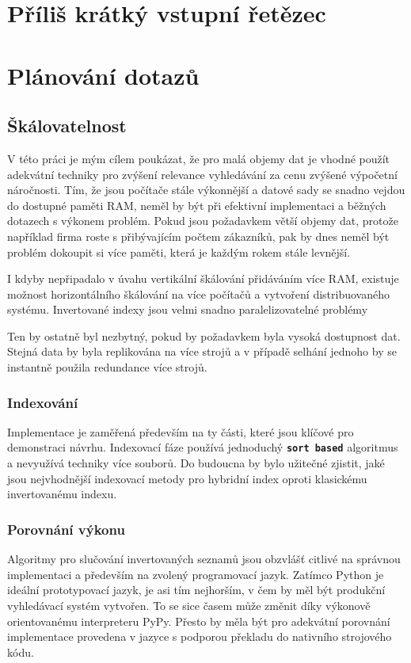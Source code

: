 \documentclass[11pt,letterpaper,oneside,openright]{book}
\newcommand{\bftt}[1]{\texttt{\textbf{#1}}}
\begin{document}
\section{Příliš krátký vstupní řetězec}
\section{Plánování dotazů}
\subsection{Škálovatelnost}
V této práci je mým cílem poukázat, že pro malá objemy dat je vhodné použít
adekvátní techniky pro zvýšení relevance vyhledávání za cenu zvýšené výpočetní
náročnosti. Tím, že jsou počítače stále výkonnější a datové sady se snadno
vejdou do dostupné paměti RAM, neměl by být při efektivní implementaci a
běžných dotazech s výkonem problém. Pokud jsou požadavkem větší objemy dat,
protože například firma roste s přibývajícím počtem zákazníků, pak by dnes
neměl být problém dokoupit si více paměti, která je každým rokem stále levnější.

I kdyby nepřipadalo v úvahu vertikální škálování přidáváním více RAM, existuje
možnost horizontálního škálování na více počítačů a vytvoření distribuovaného
systému. Invertované indexy jsou velmi snadno paralelizovatelné problémy

Ten by ostatně byl nezbytný, pokud by požadavkem byla vysoká
dostupnost dat. Stejná data by byla replikována na více strojů a v případě
selhání jednoho by se instantně použila redundance více strojů.



\subsubsection{Indexování}
Implementace je zaměřená především na ty části, které jsou klíčové pro
demonstraci návrhu. Indexovací fáze používá jednoduchý \bftt{sort based}
algoritmus a nevyužívá techniky více souborů. Do budoucna by bylo užitečné
zjistit, jaké jsou nejvhodnější indexovací metody pro hybridní index oproti
klasickému invertovanému indexu.

\subsubsection{Porovnání výkonu}
Algoritmy pro slučování invertovaných seznamů jsou obzvlášť citlivé na správnou
implementaci a především na zvolený programovací jazyk. Zatímco Python je
ideální prototypovací jazyk, je asi tím nejhorším, v čem by měl být produkční
vyhledávací systém vytvořen. To se sice časem může změnit díky výkonově
orientovanému interpreteru PyPy. Přesto by měla být pro adekvátní porovnání
implementace provedena v jazyce s podporou překladu do nativního strojového
kódu.
\end{document}
